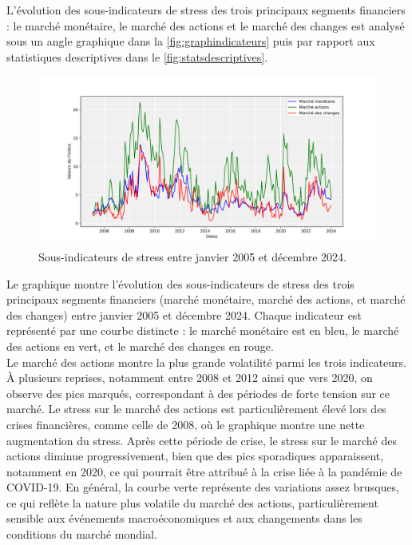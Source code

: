 \begin{sloppypar}
L'évolution des sous-indicateurs de stress des trois principaux segments financiers : le marché monétaire, le marché des actions et le marché des changes est analysé sous un angle graphique dans la \autoref{fig:graphindicateurs} puis par rapport aux statistiques descriptives dans le \autoref{fig:statsdescriptives}.

\begin{figure}[H]
    \centering
    \includegraphics[width=1\linewidth]{figures/sous_indicateurs_stress.png}
    \caption{Sous-indicateurs de stress entre janvier 2005 et décembre 2024.}
    \label{fig:graphindicateurs}
\end{figure}

Le graphique montre l'évolution des sous-indicateurs de stress des trois principaux segments financiers (marché monétaire, marché des actions, et marché des changes) entre janvier 2005 et décembre 2024. Chaque indicateur est représenté par une courbe distincte : le marché monétaire est en bleu, le marché des actions en vert, et le marché des changes en rouge.\\

Le marché des actions montre la plus grande volatilité parmi les trois indicateurs. À plusieurs reprises, notamment entre 2008 et 2012 ainsi que vers 2020, on observe des pics marqués, correspondant à des périodes de forte tension sur ce marché. Le stress sur le marché des actions est particulièrement élevé lors des crises financières, comme celle de 2008, où le graphique montre une nette augmentation du stress. Après cette période de crise, le stress sur le marché des actions diminue progressivement, bien que des pics sporadiques apparaissent, notamment en 2020, ce qui pourrait être attribué à la crise liée à la pandémie de COVID-19. En général, la courbe verte représente des variations assez brusques, ce qui reflète la nature plus volatile du marché des actions, particulièrement sensible aux événements macroéconomiques et aux changements dans les conditions du marché mondial.


\end{sloppypar}
